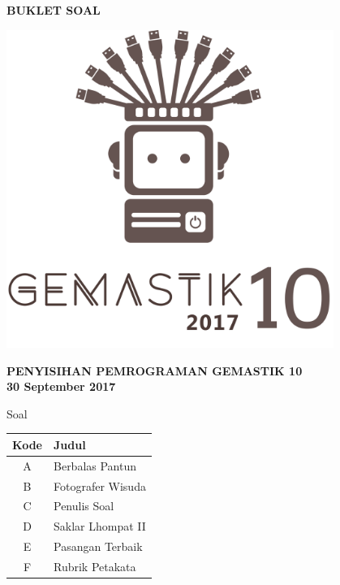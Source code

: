 \documentclass[a4paper]{article}
\begin{document}
\begin{titlepage}
\begin{center}

    \textbf{\huge BUKLET SOAL}
    
    \vspace{1cm} %
    
    \includegraphics[width=0.8\textwidth]{../gemastiklogo}
    
	\vspace{1cm} %
    
    \textbf{\LARGE PENYISIHAN PEMROGRAMAN GEMASTIK 10}\\[0.5cm]
    \textbf{\LARGE 30 September 2017}

	\vfill
	
	{\Large Soal}
	
	\vspace{.2cm}
	
	\def\arraystretch{1.5} %
	\begin{tabular}{|c|l|}
		\hline
		\textbf{Kode} & \textbf{Judul} \\
		\hline
		A & Berbalas Pantun \\
		B & Fotografer Wisuda \\
		C & Penulis Soal \\
		D & Saklar Lhompat II \\
		E & Pasangan Terbaik \\
		F & Rubrik Petakata \\
		\hline
	\end{tabular}
	
\end{center}
\end{titlepage}


\pagebreak

\pagebreak

\pagebreak

\pagebreak

\pagebreak

\end{document}
